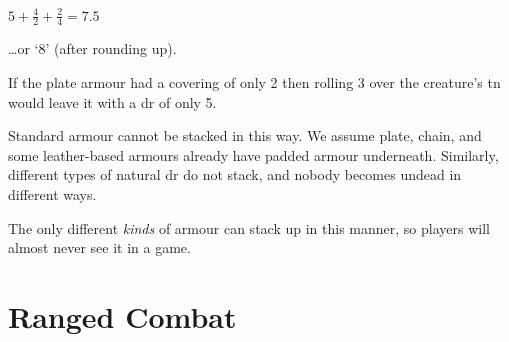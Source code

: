 \begin{multicols}{2}
\begin{center}
{
  \LARGE $5 + $\Large$\frac{4}{2} + $\normalsize$\frac{2}{4} =  7.5$
}
\end{center}

\ldots or `8' (after rounding up).

If the plate armour had a covering of only 2 then rolling 3 over the creature's \gls{tn} would leave it with a \gls{dr} of only 5.

Standard armour cannot be stacked in this way.
We assume plate, chain, and some leather-based armours already have padded armour underneath.
Similarly, different types of natural \gls{dr} do not stack, and nobody becomes undead in different ways.

The only different \emph{kinds} of armour can stack up in this manner, so players will almost never see it in a game.

\end{multicols}

\section{Ranged Combat}

